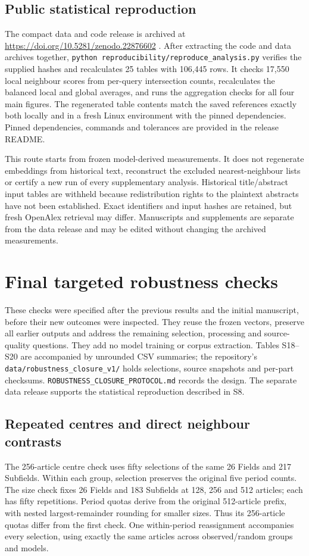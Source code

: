 \documentclass[12pt]{article}
\begin{document}
\subsection{Public statistical reproduction}
The compact data and code release is archived at \url{https://doi.org/10.5281/zenodo.22876602} \citep{treny2026reproduction}. After extracting the code and data archives together, \texttt{python }\nolinkurl{reproducibility/reproduce_analysis.py} verifies the supplied hashes and recalculates 25 tables with 106,445 rows. It checks 17,550 local neighbour scores from per-query intersection counts, recalculates the balanced local and global averages, and runs the aggregation checks for all four main figures. The regenerated table contents match the saved references exactly both locally and in a fresh Linux environment with the pinned dependencies. Pinned dependencies, commands and tolerances are provided in the release README.

This route starts from frozen model-derived measurements. It does not regenerate embeddings from historical text, reconstruct the excluded nearest-neighbour lists or certify a new run of every supplementary analysis. Historical title/abstract input tables are withheld because redistribution rights to the plaintext abstracts have not been established. Exact identifiers and input hashes are retained, but fresh OpenAlex retrieval may differ. Manuscripts and supplements are separate from the data release and may be edited without changing the archived measurements.


\clearpage
\section{Final targeted robustness checks}
These checks were specified after the previous results and the initial manuscript, before their new outcomes were inspected. They reuse the frozen vectors, preserve all earlier outputs and address the remaining selection, processing and source-quality questions. They add no model training or corpus extraction. Tables S18--S20 are accompanied by unrounded CSV summaries; the repository's \nolinkurl{data/robustness_closure_v1/} holds selections, source snapshots and per-part checksums. \nolinkurl{ROBUSTNESS_CLOSURE_PROTOCOL.md} records the design. The separate data release supports the statistical reproduction described in S8.

\subsection{Repeated centres and direct neighbour contrasts}
The 256-article centre check uses fifty selections of the same 26 Fields and 217 Subfields. Within each group, selection preserves the original five period counts. The size check fixes 26 Fields and 183 Subfields at 128, 256 and 512 articles; each has fifty repetitions. Period quotas derive from the original 512-article prefix, with nested largest-remainder rounding for smaller sizes. Thus its 256-article quotas differ from the first check. One within-period reassignment accompanies every selection, using exactly the same articles across observed/random groups and models.
\end{document}
